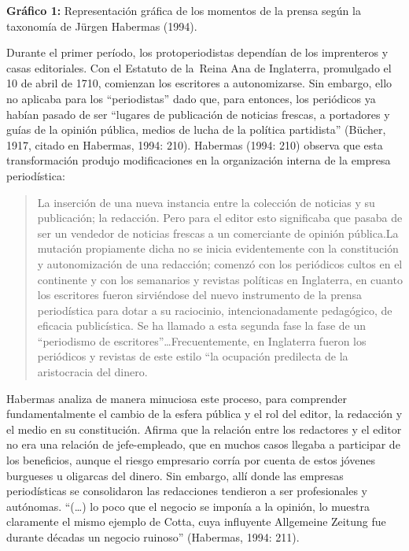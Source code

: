 \textbf{Gráfico 1:} Representación gráfica de los momentos de la prensa según la taxonomía de Jürgen Habermas (1994).

Durante el primer período, los protoperiodistas dependían de los imprenteros y casas editoriales. Con el Estatuto de la~Reina Ana de Inglaterra, promulgado el 10 de abril de 1710, comienzan los escritores a autonomizarse. Sin embargo, ello no aplicaba para los ``periodistas'' dado que, para entonces, los periódicos ya habían pasado de ser ``lugares de publicación de noticias frescas, a portadores y guías de la opinión pública, medios de lucha de la política partidista'' (Bücher, 1917, citado en Habermas, 1994: 210). Habermas (1994: 210) observa que esta transformación produjo modificaciones en la organización interna de la empresa periodística:

\begin{quote}
La inserción de una nueva instancia entre la colección de noticias y su publicación; la redacción. Pero para el editor esto significaba que pasaba de ser un vendedor de noticias frescas a un comerciante de opinión pública.La mutación propiamente dicha no se inicia evidentemente con la constitución y autonomización de una redacción; comenzó con los periódicos cultos en el continente y con los semanarios y revistas políticas en Inglaterra, en cuanto los escritores fueron sirviéndose del nuevo instrumento de la prensa periodística para dotar a su raciocinio, intencionadamente pedagógico, de eficacia publicística. Se ha llamado a esta segunda fase la fase de un ``periodismo de escritores''\ldots Frecuentemente, en Inglaterra fueron los periódicos y revistas de este estilo ``la ocupación predilecta de la aristocracia del dinero.
\end{quote}

Habermas analiza de manera minuciosa este proceso, para comprender fundamentalmente el cambio de la esfera pública y el rol del editor, la redacción y el medio en su constitución. Afirma que la relación entre los redactores y el editor no era una relación de jefe-empleado, que en muchos casos llegaba a participar de los beneficios, aunque el riesgo empresario corría por cuenta de estos jóvenes burgueses u oligarcas del dinero. Sin embargo, allí donde las empresas periodísticas se consolidaron las redacciones tendieron a ser profesionales y autónomas. ``(\ldots) lo poco que el negocio se imponía a la opinión, lo muestra claramente el mismo ejemplo de Cotta, cuya influyente Allgemeine Zeitung fue durante décadas un negocio ruinoso'' (Habermas, 1994: 211).

